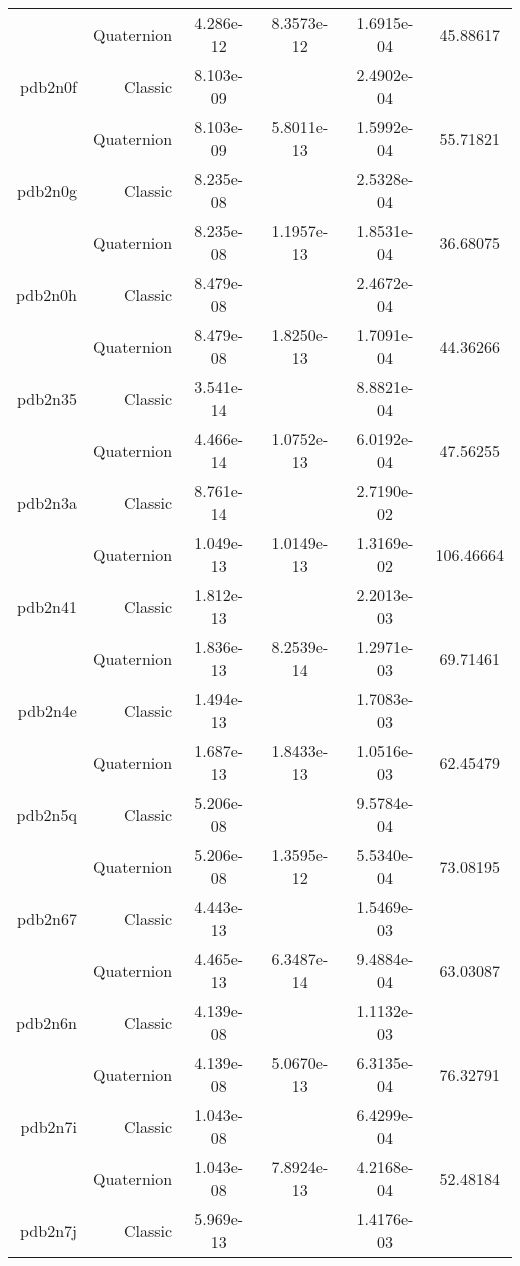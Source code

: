 \begin{xltabular}{\textwidth}{r|rS[table-format=1.3e+2]S[table-format=1.4e+2]S[table-format=1.4e+2]S[table-format=-1.5]}
& Quaternion & 4.286e-12 & 8.3573e-12 & 1.6915e-04 & 45.88617\\  \addlinespace
pdb2n0f & Classic & 8.103e-09 &  & 2.4902e-04 & \\
& Quaternion & 8.103e-09 & 5.8011e-13 & 1.5992e-04 & 55.71821\\  \addlinespace
pdb2n0g & Classic & 8.235e-08 &  & 2.5328e-04 & \\
& Quaternion & 8.235e-08 & 1.1957e-13 & 1.8531e-04 & 36.68075\\  \addlinespace
pdb2n0h & Classic & 8.479e-08 &  & 2.4672e-04 & \\
& Quaternion & 8.479e-08 & 1.8250e-13 & 1.7091e-04 & 44.36266\\  \addlinespace
pdb2n35 & Classic & 3.541e-14 &  & 8.8821e-04 & \\
& Quaternion & 4.466e-14 & 1.0752e-13 & 6.0192e-04 & 47.56255\\  \addlinespace
pdb2n3a & Classic & 8.761e-14 &  & 2.7190e-02 & \\
& Quaternion & 1.049e-13 & 1.0149e-13 & 1.3169e-02 & 106.46664\\  \addlinespace
pdb2n41 & Classic & 1.812e-13 &  & 2.2013e-03 & \\
& Quaternion & 1.836e-13 & 8.2539e-14 & 1.2971e-03 & 69.71461\\  \addlinespace
pdb2n4e & Classic & 1.494e-13 &  & 1.7083e-03 & \\
& Quaternion & 1.687e-13 & 1.8433e-13 & 1.0516e-03 & 62.45479\\  \addlinespace
pdb2n5q & Classic & 5.206e-08 &  & 9.5784e-04 & \\
& Quaternion & 5.206e-08 & 1.3595e-12 & 5.5340e-04 & 73.08195\\  \addlinespace
pdb2n67 & Classic & 4.443e-13 &  & 1.5469e-03 & \\
& Quaternion & 4.465e-13 & 6.3487e-14 & 9.4884e-04 & 63.03087\\  \addlinespace
pdb2n6n & Classic & 4.139e-08 &  & 1.1132e-03 & \\
& Quaternion & 4.139e-08 & 5.0670e-13 & 6.3135e-04 & 76.32791\\  \addlinespace
pdb2n7i & Classic & 1.043e-08 &  & 6.4299e-04 & \\
& Quaternion & 1.043e-08 & 7.8924e-13 & 4.2168e-04 & 52.48184\\  \addlinespace
pdb2n7j & Classic & 5.969e-13 &  & 1.4176e-03 & \\

\end{xltabular}
